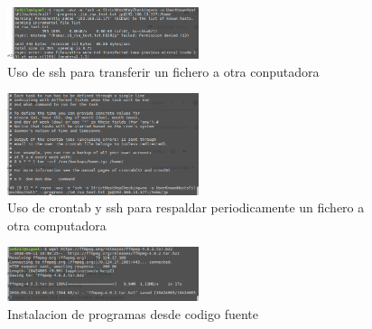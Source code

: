 \documentclass[11pt]{article}
\begin{document}
\begin{figure}[H]
\centering
\includegraphics[width=0.5\textwidth]{img/18.png}
\caption{Uso de ssh para transferir un fichero a otra conputadora}
\end{figure}

\begin{figure}[H]
\centering
\includegraphics[width=0.5\textwidth]{img/19.png}
\caption{Uso de crontab y ssh para respaldar periodicamente un fichero a otra computadora}
\end{figure}

\begin{figure}[H]
\centering
\includegraphics[width=0.5\textwidth]{img/20.png}
\caption{Instalacion de programas desde codigo fuente}
\end{figure}


\newpage


\end{document}
